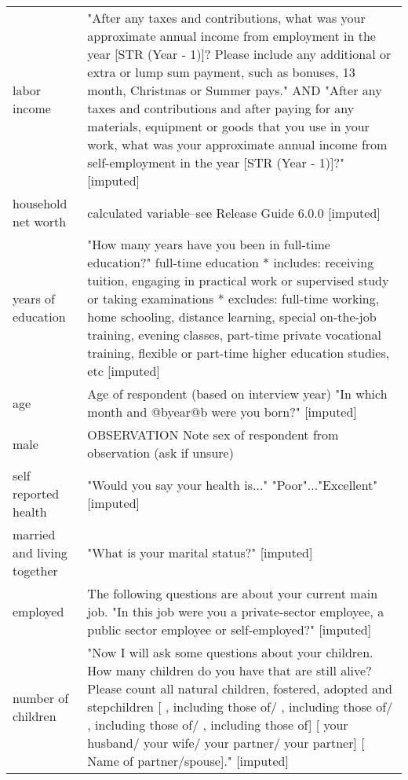 \begin{table}[H]
\begin{tabular} {p{1.5in}p{4.5in}}
  labor income & "After any taxes and contributions, what was your approximate annual income from employment in the year [STR (Year - 1)]? Please include any additional or extra or lump sum payment, such as bonuses, 13 month, Christmas or Summer pays." AND "After any taxes and contributions and after paying for any materials, equipment or goods that you use in your work, what was your approximate annual income from self-employment in the year [STR (Year - 1)]?" [imputed] \\
  household net worth & calculated variable--see Release Guide 6.0.0 [imputed] \\
  years of education & "How many years have you been in full-time education?" full-time education * includes: receiving tuition, engaging in practical work or supervised study or taking examinations * excludes: full-time working, home schooling, distance learning, special on-the-job training, evening classes, part-time private vocational training, flexible or part-time higher education studies, etc  [imputed] \\
  age & Age of respondent (based on interview year)  "In which month and @byear@b were you born?" [imputed] \\
  male & OBSERVATION Note sex of respondent from observation (ask if unsure) \\
  self reported health & "Would you say your health is..." "Poor"..."Excellent" [imputed] \\
  married and living together & "What is your marital status?"  [imputed] \\
  employed & The following questions are about your current main job. "In this job were you a private-sector employee, a public sector employee or self-employed?"  [imputed] \\
  number of children & "Now I will ask some questions about your children. How many children do you have that are still alive? Please count all natural children, fostered, adopted and stepchildren [ , including those of/ , including those of/ , including those of/ , including those of] [ your husband/ your wife/ your partner/ your partner] [ {Name of partner/spouse}]." [imputed] \\
\hline\end{tabular}\end{table}